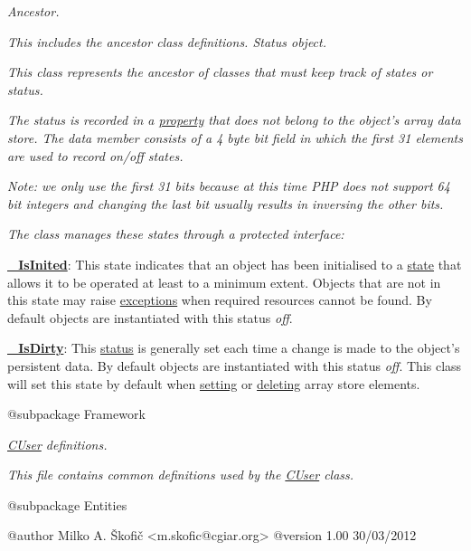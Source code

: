 {\itshape Ancestor.}

{\itshape This includes the ancestor class definitions. Status object.}

{\itshape This class represents the ancestor of classes that must keep track of states or status.}

{\itshape The status is recorded in a \hyperlink{}{property} that does not belong to the object's array data store. The data member consists of a 4 byte bit field in which the first 31 elements are used to record on/off states.}

{\itshape {\itshape Note\-: we only use the first 31 bits because at this time P\-H\-P does not support 64 bit integers and changing the last bit usually results in inversing the other bits.}}

{\itshape The class manages these states through a protected interface\-:}

{\itshape 
\begin{DoxyItemize}
\item {\bfseries \hyperlink{}{\-\_\-\-Is\-Inited}}\-: This state indicates that an object has been initialised to a \hyperlink{}{state} that allows it to be operated at least to a minimum extent. Objects that are not in this state may raise \hyperlink{}{exceptions} when required resources cannot be found. By default objects are instantiated with this status {\itshape off}. 
\item {\bfseries \hyperlink{}{\-\_\-\-Is\-Dirty}}\-: This \hyperlink{}{status} is generally set each time a change is made to the object's persistent data. By default objects are instantiated with this status {\itshape off}. This class will set this state by default when \hyperlink{}{setting} or \hyperlink{}{deleting} array store elements. 
\end{DoxyItemize}}

{\itshape \begin{DoxyVerb} @subpackage        Framework\end{DoxyVerb}
}

{\itshape \hyperlink{class_c_user}{C\-User} definitions.}

{\itshape This file contains common definitions used by the \hyperlink{class_c_user}{C\-User} class.}

{\itshape \begin{DoxyVerb} @subpackage        Entities

 @author            Milko A. Škofič <m.skofic@cgiar.org>
 @version   1.00 30/03/2012\end{DoxyVerb}
}

